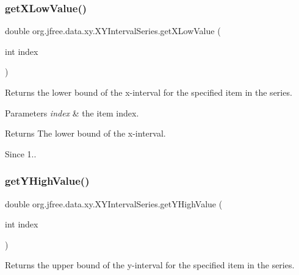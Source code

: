 \subsubsection{\texorpdfstring{get\+X\+Low\+Value()}{getXLowValue()}}
{\footnotesize\ttfamily double org.\+jfree.\+data.\+xy.\+X\+Y\+Interval\+Series.\+get\+X\+Low\+Value (\begin{DoxyParamCaption}\item[{int}]{index }\end{DoxyParamCaption})}

Returns the lower bound of the x-\/interval for the specified item in the series.


\begin{DoxyParams}{Parameters}
{\em index} & the item index.\\
\hline
\end{DoxyParams}
\begin{DoxyReturn}{Returns}
The lower bound of the x-\/interval.
\end{DoxyReturn}
\begin{DoxySince}{Since}
1.. 
\end{DoxySince}
\mbox{\label{classorg_1_1jfree_1_1data_1_1xy_1_1_x_y_interval_series_ad7950a8dbdddaa85d002c9c7ccdfd1ab}} 
\subsubsection{\texorpdfstring{get\+Y\+High\+Value()}{getYHighValue()}}
{\footnotesize\ttfamily double org.\+jfree.\+data.\+xy.\+X\+Y\+Interval\+Series.\+get\+Y\+High\+Value (\begin{DoxyParamCaption}\item[{int}]{index }\end{DoxyParamCaption})}

Returns the upper bound of the y-\/interval for the specified item in the series.


